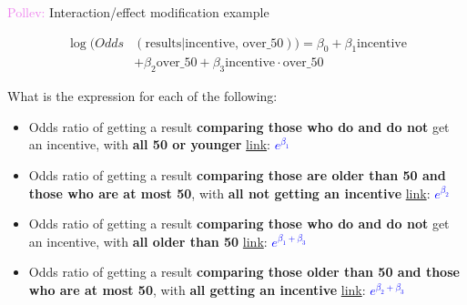 \documentclass[10pt,t]{beamer}
\begin{document}
\begin{frame}{\textcolor{violet}{Pollev:} Interaction/effect modification example}
	
	\vspace{-5 mm}
	
	\color{blue}
	\begin{align*}
	\log(Odds&(\text{results}|\text{incentive, over\_50})) = \beta_0 + \beta_1\text{incentive}\\&+\beta_2\text{over\_50}+\beta_3\text{incentive}\cdot\text{over\_50}
	\end{align*}
	\color{black}
	
	\vspace{-2 mm}
	
	What is the expression for each of the following:
	
	\medskip
	
	\begin{itemize}
		\item Odds ratio of getting a result \textbf{comparing those who do and do not} get an incentive, with \textbf{all 50 or younger} \textcolor{purple}{\href{https://PollEv.com/multiple_choice_polls/BTSCKv3ofieOMwW8bEYwT/respond}{link}}: \pause  \textcolor{blue}{$e^{\beta_1}$}
		
		\medskip
		
		\item Odds ratio of getting a result \textbf{comparing those are older than 50 and those who are at most 50}, with \textbf{all not getting an incentive} \textcolor{purple}{\href{https://PollEv.com/multiple_choice_polls/M9GzJr976YmfdwfTmqNUB/respond}{link}}: \pause  \textcolor{blue}{$e^{\beta_2}$}
		
		\medskip
		
		\item Odds ratio of getting a result \textbf{comparing those who do and do not} get an incentive, with \textbf{all older than 50} \textcolor{purple}{\href{https://PollEv.com/multiple_choice_polls/QlJlfru1e0LWCDAjbmbHe/respond}{link}}: \pause  \textcolor{blue}{$e^{\beta_1+\beta_3}$}
		
		\medskip
		
		\item Odds ratio of getting a result \textbf{comparing those older than 50 and those who are at most 50}, with \textbf{all getting an incentive} \textcolor{purple}{\href{https://PollEv.com/multiple_choice_polls/uclSu0e57aLCbVT1ElIlw/respond}{link}}: \pause  \textcolor{blue}{$e^{\beta_2+\beta_3}$}
		
		
		
	\end{itemize}
	
\end{frame}
\end{document}

